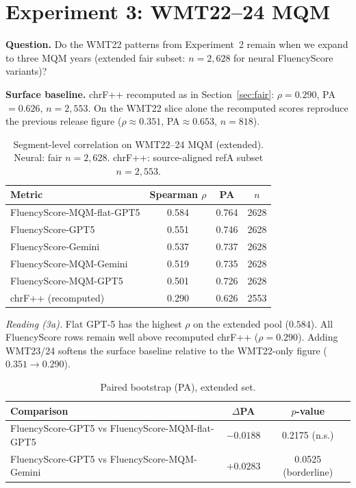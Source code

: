 \documentclass[11pt]{article}
\newcommand{\FS}{FluencyScore}
\begin{document}
\section{Experiment 3: WMT22--24 MQM}
\label{sec:exp3}
\textbf{Question.}
Do the WMT22 patterns from Experiment~2 remain when we expand to three MQM years
(extended fair subset: $n{=}2{,}628$ for neural \FS{} variants)?

\textbf{Surface baseline.}
chrF++ recomputed as in Section~\ref{sec:fair}:
$\rho{=}0.290$, PA${=}0.626$, $n{=}2{,}553$.
On the WMT22 slice alone the recomputed scores reproduce the previous release
figure ($\rho{\approx}0.351$, PA${\approx}0.653$, $n{=}818$).

\begin{table}[t]
\centering
\scriptsize
\caption{Segment-level correlation on WMT22--24 MQM (extended). Neural: fair $n{=}2{,}628$. chrF++: source-aligned refA subset $n{=}2{,}553$.}
\label{tab:3a}
\begin{tabularx}{\columnwidth}{>{\raggedright\arraybackslash}Xccc}
\toprule
Metric & Spearman $\rho$ & PA & $n$ \\
\midrule
\FS{}-MQM-flat-GPT5 & 0.584 & 0.764 & 2628 \\
\FS{}-GPT5 & 0.551 & 0.746 & 2628 \\
\FS{}-Gemini & 0.537 & 0.737 & 2628 \\
\FS{}-MQM-Gemini & 0.519 & 0.735 & 2628 \\
\FS{}-MQM-GPT5 & 0.501 & 0.726 & 2628 \\
chrF++ (recomputed) & 0.290 & 0.626 & 2553 \\
\bottomrule
\end{tabularx}

\end{table}


\textit{Reading (3a).}
Flat GPT-5 has the highest $\rho$ on the extended pool ($0.584$).
All \FS{} rows remain well above recomputed chrF++ ($\rho{=}0.290$).
Adding WMT23/24 softens the surface baseline relative to the WMT22-only figure
($0.351{\rightarrow}0.290$).

\begin{table}[t]
\centering
\scriptsize
\caption{Paired bootstrap (PA), extended set.}
\label{tab:3b}
\begin{tabularx}{\columnwidth}{@{}>{\raggedright\arraybackslash}Xcc@{}}
\toprule
Comparison & $\Delta$PA & $p$-value \\
\midrule
\FS{}-GPT5 vs \FS{}-MQM-flat-GPT5 & $-0.0188$ & 0.2175 (n.s.) \\
\FS{}-GPT5 vs \FS{}-MQM-Gemini & $+0.0283$ & 0.0525 (borderline) \\
\bottomrule
\end{tabularx}

\end{table}
\end{document}
